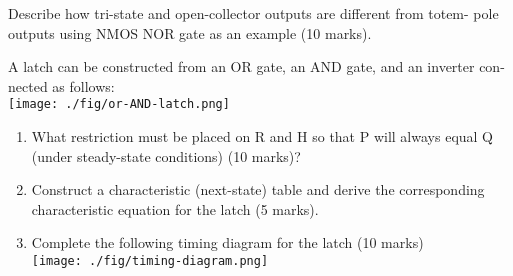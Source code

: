 \begin{prob}
  Describe how tri-state and open-collector outputs are different from totem-
  pole outputs using NMOS NOR gate as an example (10 marks).
\end{prob}


\begin{prob}
  A latch can be constructed from an OR gate, an AND gate, and an inverter con-
  nected as follows: \\
  \texttt{[image: ./fig/or-AND-latch.png]}\\
  \begin{enumerate}
    \item  What restriction must be placed on R and H so that P will always equal Q
    (under steady-state conditions) (10 marks)?
  \item Construct a characteristic (next-state) table and derive the
    corresponding characteristic equation for the latch (5 marks).
  \item Complete the following timing diagram for the latch (10 marks)\\
    \texttt{[image: ./fig/timing-diagram.png]}
  \end{enumerate}
\end{prob}

